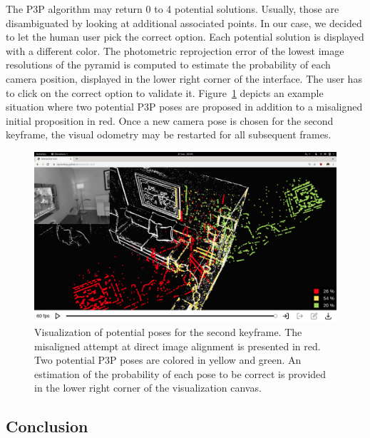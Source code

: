 The P3P algorithm may return 0 to 4 potential solutions.
Usually, those are disambiguated by looking at additional associated points.
In our case, we decided to let the human user pick the correct option.
Each potential solution is displayed with a different color.
The photometric reprojection error of the lowest image resolutions of the pyramid
is computed to estimate the probability of each camera position,
displayed in the lower right corner of the interface.
The user has to click on the correct option to validate it.
Figure~\ref{fig:p3p-two-poses} depicts an example situation where two potential
P3P poses are proposed in addition to a misaligned initial proposition in red.
Once a new camera pose is chosen for the second keyframe,
the visual odometry may be restarted for all subsequent frames.

\begin{figure}[ht]
	\centering
	\includegraphics[width=\linewidth]{assets/img/p3p-two.png}
	\caption{Visualization of potential poses for the second keyframe.
	The misaligned attempt at direct image alignment is presented in red.
	Two potential P3P poses are colored in yellow and green.
	An estimation of the probability of each pose to be correct is
	provided in the lower right corner of the visualization canvas.}%
	\label{fig:p3p-two-poses}
\end{figure}

\subsection{Conclusion}%
\label{sub:vors-ccl}


